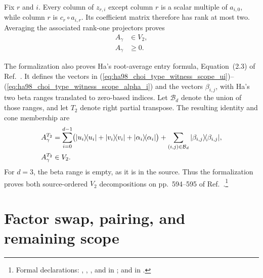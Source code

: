 \documentclass{article}
\begin{document}
Fix $r$ and $i$. Every column of $z_{r,i}$ except column $r$ is a scalar
multiple of $a_{i,0}$, while column $r$ is $c_r\circ a_{i,r}$. Its coefficient
matrix therefore has rank at most two. Averaging the associated rank-one
projectors proves
\begin{align}
    A_\gamma
        &\in V_2,
    \label{eq:ha98_choi_type_witness_scope_agamma_vtwo}\\
    A_\gamma
        &\geq0.
    \label{eq:ha98_choi_type_witness_scope_agamma_positive}
\end{align}

The formalization also proves Ha's root-average entry formula, Equation~(2.3)
of Ref.~\cite{Ha1998AtomicPositiveMaps}. It defines the vectors in
(\ref{eq:ha98_choi_type_witness_scope_ui})--%
(\ref{eq:ha98_choi_type_witness_scope_alpha_i}) and the vectors
$\beta_{i,j}$, with Ha's two beta ranges translated to zero-based indices.
Let $\mathcal B_d$ denote the union of those ranges, and let $T_2$ denote right
partial transpose. The resulting identity and cone membership are
\begin{align}
    A_\gamma^{T_2}
        &=\sum_{i=0}^{d-1}
          \bigl(          |u_i\rangle\!\langle u_i|
              +|v_i\rangle\!\langle v_i|
              +|\alpha_i\rangle\!\langle \alpha_i|
          \bigr)
          +\sum_{(i,j)\in\mathcal B_d}
            |\beta_{i,j}\rangle\!\langle \beta_{i,j}|,
    \label{eq:ha98_choi_type_witness_scope_formal_block_transpose}\\
    A_\gamma^{T_2}
        &\in V_2.
    \label{eq:ha98_choi_type_witness_scope_formal_block_transpose_vtwo}
\end{align}
For $d=3$, the beta range is empty, as it is in the source. Thus the
formalization proves both source-ordered $V_2$ decompositions on pp.~594--595
of Ref.~\cite{Ha1998AtomicPositiveMaps}.\footnote{Formal declarations:
    ,
    ,
    , and
     in
    ;
    and
    in .}

\section{Factor swap, pairing, and remaining scope}
\end{document}
